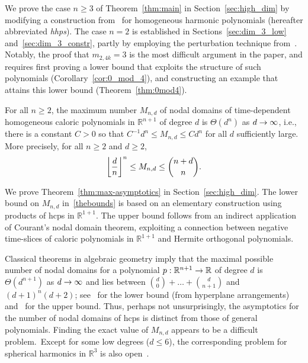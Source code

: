 \documentclass[AHL,Unicode,longabstracts,published]{cedram}
\newcommand{\R}{\mathbb{R}}
\renewcommand*{\to}{\mathchoice{\longrightarrow}{\rightarrow}{\rightarrow}{\rightarrow}}
\let\originalleft\left
\let\originalright\right
\renewcommand{\left}{\mathopen{}\mathclose\bgroup\originalleft}
\renewcommand{\right}{\aftergroup\egroup\originalright}
\newcommand{\R}{\mathbb{R}}
\begin{document}
We prove the case $n\geq 3$ of Theorem~\ref{thm:main} in Section~\ref{sec:high_dim} by modifying a construction from~\cite{BET17} for homogeneous harmonic polynomials (hereafter abbreviated \emph{hhps}). The case $n=2$ is established in Sections~\ref{sec:dim_3_low} and~\ref{sec:dim_3_constr}, partly by employing the perturbation technique from~\cite{Lewy77}. Notably, the proof that $m_{2,4k}=3$ is the most difficult argument in the paper, and requires first proving a lower bound that exploits the structure of such polynomials (Corollary~\ref{cor:0_mod_4}), and constructing an example that attains this lower bound (Theorem~\ref{thm:0mod4}).

\begin{theo} \label{thm:max-asymptotics}
For all $n\geq 2$, the maximum number $M_{n,d}$ of nodal domains of time-dependent homogeneous caloric polynomials in $\R^{n+1}$ of degree $d$ is $\Theta(d^n)$ as $d\to\infty$, i.e., there is a constant $C >0 $ so that $C^{-1} d^n \le M_{n,d} \le C d^n$ for all $d$ sufficiently large. More precisely, for all $n\geq 2$ and $d\geq 2$,
\begin{equation}
\left\lfloor \frac{d}{n}\right\rfloor^n \le M_{n,d} \le \binom{n+d}{n}. \label{thebounds}
\end{equation}
\end{theo}

We prove Theorem~\ref{thm:max-asymptotics} in Section~\ref{sec:high_dim}. The lower bound on $M_{n,d}$ in~\eqref{thebounds} is based on an elementary construction using products of hcps in $\R^{1+1}$. The upper bound follows from an indirect application of Courant's nodal domain theorem, exploiting a connection between negative time-slices of caloric polynomials in $\R^{1+1}$ and Hermite orthogonal polynomials.

\begin{rema}
Classical theorems in algebraic geometry imply that the maximal {possible} number of nodal domains {for a} polynomial $p:\R^{n+1}\to\R$ of degree $d$ is $\Theta(d^{n+1})$ as $d\to\infty$ and lies between $\binom{d}{0}+\dots+\binom{d}{n+1}$ and $(d+1)^n(d+2)$; see~\cite[Proposition~2.4]{stanley-parkcity} for the lower bound (from hyperplane arrangements) and~\cite[Theorem~3]{M64} for the upper bound. Thus, perhaps not unsurprisingly, the {asymptotics for the number of nodal domains of }hcps is distinct from those of general polynomials. Finding the exact value of $M_{n,d}$ appears to be a difficult problem.~Except for some low degrees ($d\leq 6$), the corresponding problem for spherical harmonics in $\R^3$ is also open~\cite{Leydold96}.
\end{rema}
\end{document}
